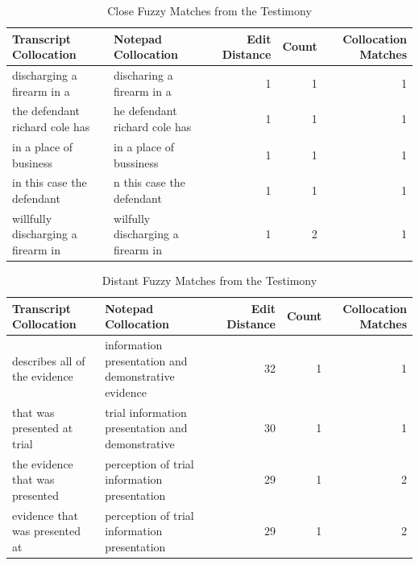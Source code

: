 \documentclass[print]{nuthesis}
\begin{document}
\newpage
\begin{landscape}

\begin{table}

\caption{\label{tab:fuzzyexam}Close Fuzzy Matches from the Testimony}
\centering
\begin{tabular}[t]{l|l|r|r|r}
\hline
Transcript Collocation & Notepad Collocation & Edit Distance & Count & Collocation Matches\\
\hline
discharging
a
firearm
in a & discharing
a
firearm
in a & 1 & 1 & 1\\
\hline
the
defendant
richard
cole
has & he
defendant
richard
cole
has & 1 & 1 & 1\\
\hline
in a
place
of
business & in a
place
of
bussiness & 1 & 1 & 1\\
\hline
in
this
case
the
defendant & n
this
case
the
defendant & 1 & 1 & 1\\
\hline
willfully
discharging
a
firearm
in & wilfully
discharging
a
firearm
in & 1 & 2 & 1\\
\hline
\end{tabular}
\end{table}

\begin{table}

\caption{\label{tab:fuzzyexamlarge}Distant Fuzzy Matches from the Testimony}
\centering
\begin{tabular}[t]{l|l|r|r|r}
\hline
Transcript Collocation & Notepad Collocation & Edit Distance & Count & Collocation Matches\\
\hline
describes
all
of
the
evidence & information
presentation
and
demonstrative
evidence & 32 & 1 & 1\\
\hline
that
was
presented
at
trial & trial
information
presentation
and
demonstrative & 30 & 1 & 1\\
\hline
the
evidence
that
was
presented & perception
of
trial
information
presentation & 29 & 1 & 2\\
\hline
evidence
that
was
presented
at & perception
of
trial
information
presentation & 29 & 1 & 2\\
\hline
\end{tabular}
\end{table}

\end{landscape}
\end{document}
